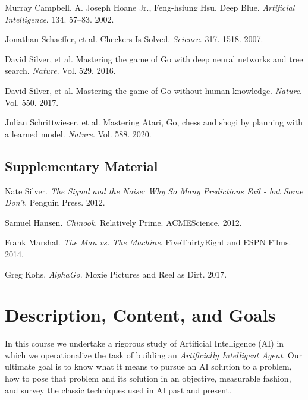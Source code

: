 \documentclass[10pt]{article}
\begin{document}
\noindent Murray Campbell, A. Joseph Hoane Jr., Feng-hsiung Hsu. Deep Blue. \textit{Artificial Intelligence}. 134. 57--83. 2002.
\newline

\noindent Jonathan Schaeffer, et al. Checkers Is Solved. \textit{Science}. 317. 1518. 2007.
\newline

\noindent David Silver, et al. Mastering the game of Go with deep neural networks and tree search. \textit{Nature}. Vol. 529. 2016. 
\newline

\noindent David Silver, et al. Mastering the game of Go without human knowledge. \textit{Nature}. Vol. 550. 2017.
\newline

\noindent Julian Schrittwieser, et al. Mastering Atari, Go, chess and shogi by planning with a learned model. \textit{Nature.} Vol. 588. 2020. 

\subsection*{Supplementary Material}

\noindent Nate Silver. \textit{The Signal and the Noise: Why So Many Predictions Fail - but Some Don't}. Penguin Press. 2012. 
\newline

\noindent Samuel Hansen. \textit{Chinook}. Relatively Prime. ACMEScience. 2012. 
\newline

\noindent Frank Marshal. \textit{The Man vs. The Machine}. FiveThirtyEight and ESPN Films. 2014. 
\newline

\noindent Greg Kohs. \textit{AlphaGo}. Moxie Pictures and Reel as Dirt. 2017. 


 
\section{Description, Content, and Goals}

In this course we undertake a rigorous study of Artificial Intelligence (AI) in which we operationalize the task of building an \textit{Artificially Intelligent Agent}. Our ultimate goal is to know what it means to pursue an AI solution to a problem, how to pose that problem and its solution in an objective, measurable fashion, and survey the classic techniques used in AI past and present. 
\end{document}
